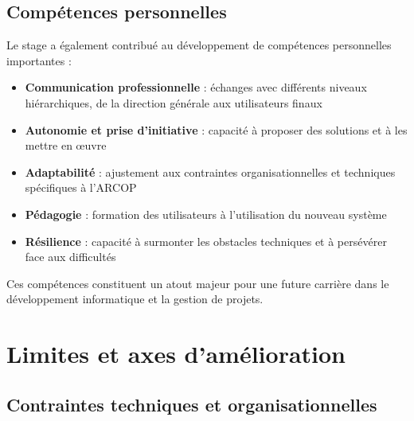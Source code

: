 \subsection{Compétences personnelles}
Le stage a également contribué au développement de compétences personnelles importantes :

\begin{itemize}
    \item \textbf{Communication professionnelle} : échanges avec différents niveaux hiérarchiques, de la direction générale aux utilisateurs finaux
    
    \item \textbf{Autonomie et prise d'initiative} : capacité à proposer des solutions et à les mettre en œuvre
    
    \item \textbf{Adaptabilité} : ajustement aux contraintes organisationnelles et techniques spécifiques à l'ARCOP
    
    \item \textbf{Pédagogie} : formation des utilisateurs à l'utilisation du nouveau système
    
    \item \textbf{Résilience} : capacité à surmonter les obstacles techniques et à persévérer face aux difficultés
\end{itemize}

Ces compétences constituent un atout majeur pour une future carrière dans le développement informatique et la gestion de projets.

\section{Limites et axes d'amélioration}

\subsection{Contraintes techniques et organisationnelles}


